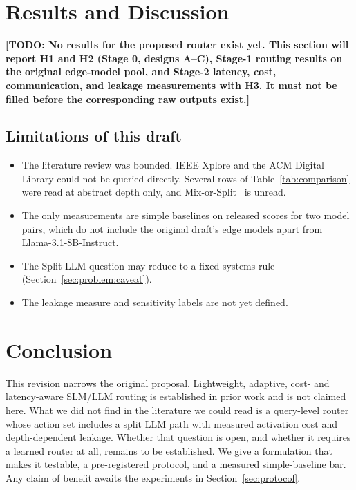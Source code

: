 \documentclass[lettersize,journal]{IEEEtran}
\newcommand{\todo}[1]{\textbf{[TODO: #1]}}
\begin{document}
\section{Results and Discussion}
\label{sec:results}
\todo{No results for the proposed router exist yet. This section will report
H1 and H2 (Stage 0, designs A--C), Stage-1 routing results on the original
edge-model pool, and Stage-2 latency, cost, communication, and leakage
measurements with H3. It must not be filled before the corresponding raw outputs
exist.}

\subsection{Limitations of this draft}
\begin{itemize}
\item The literature review was bounded. IEEE Xplore and the ACM Digital Library
could not be queried directly. Several rows of Table~\ref{tab:comparison} were
read at abstract depth only, and Mix-or-Split~\cite{wang2026mix} is unread.
\item The only measurements are simple baselines on released scores for two
model pairs, which do not include the original draft's edge models apart from
Llama-3.1-8B-Instruct.
\item The Split-LLM question may reduce to a fixed systems rule
(Section~\ref{sec:problem:caveat}).
\item The leakage measure and sensitivity labels are not yet defined.
\end{itemize}

\section{Conclusion}
\label{sec:conclusion}
This revision narrows the original proposal. Lightweight, adaptive, cost- and
latency-aware SLM/LLM routing is established in prior work and is not claimed
here. What we did not find in the literature we could read is a query-level router whose
action set includes a split LLM path with measured activation cost and
depth-dependent leakage. Whether that question is open, and whether it requires
a learned router at all, remains to be established. We give a formulation that
makes it testable, a pre-registered protocol, and a measured simple-baseline
bar. Any claim of benefit awaits the experiments in Section~\ref{sec:protocol}.



\end{document}
